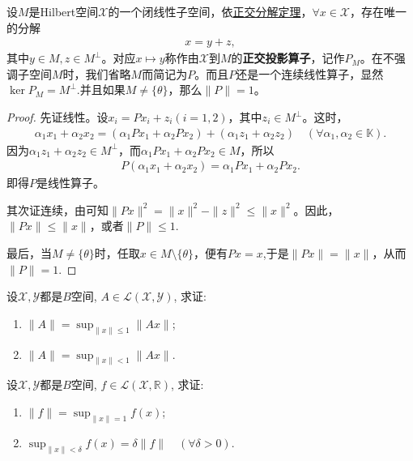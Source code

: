 \documentclass[../../main.tex]{subfiles}%
\begin{document}
\begin{theorem}\label{theorem:正交投影算子定义}
设$M$是Hilbert空间$\mathscr{X}$的一个闭线性子空间，依\hyperref[corollary:泛函分析--正交分解定理]{正交分解定理}，$\forall x\in\mathscr{X}$，存在唯一的分解
\begin{align*}
x=y+z,
\end{align*}
其中$y\in M,z\in M^\perp$。对应$x\mapsto y$称作由$\mathscr{X}$到$M$的\textbf{正交投影算子}，记作$P_M$。在不强调子空间$M$时，我们省略$M$而简记为$P$。而且$P$还是一个连续线性算子，显然$\ker P_M=M^\bot$.并且如果$M\neq\{\theta\}$，那么$\|P\|=1$。
\end{theorem}
\begin{proof}

先证线性。设$x_i=Px_i+z_i(i=1,2)$，其中$z_i\in M^\perp$。这时，
\begin{align*}
\alpha_1x_1+\alpha_2x_2=(\alpha_1Px_1+\alpha_2Px_2)+(\alpha_1z_1+\alpha_2z_2)\quad (\forall \alpha_1,\alpha_2\in\mathbb{K}).
\end{align*}
因为$\alpha_1z_1+\alpha_2z_2\in M^\perp$，而$\alpha_1Px_1+\alpha_2Px_2\in M$，所以
\begin{align*}
P(\alpha_1x_1+\alpha_2x_2)=\alpha_1Px_1+\alpha_2Px_2.
\end{align*}
即得$P$是线性算子。

其次证连续，由可知$\|Px\|^2=\|x\|^2-\|z\|^2\leqslant\|x\|^2$。因此，$\|Px\|\leqslant\|x\|$，或者$\|P\|\leqslant1$.

最后，当$M\neq\{\theta\}$时，任取$x\in M\setminus\{\theta\}$，便有$Px=x$,于是$\|Px\|=\|x\|$，从而$\|P\|=1$.
\end{proof}

\begin{example}
设$\mathscr{X},\mathscr{Y}$都是$B$空间, $A \in \mathscr{L}(\mathscr{X},\mathscr{Y})$, 求证:
\begin{enumerate}[(1)]
\item $\|A\| = \sup_{\|x\| \leqslant 1} \|Ax\|$;
\item $\|A\| = \sup_{\|x\| < 1} \|Ax\|$.
\end{enumerate}
\end{example}

\begin{example}
设$\mathscr{X},\mathscr{Y}$都是$B$空间, $f \in \mathscr{L}(\mathscr{X},\mathbb{R})$, 求证:
\begin{enumerate}[(1)]
\item $\|f\| = \sup_{\|x\| = 1} f(x)$;
\item $\sup_{\|x\| < \delta} f(x) = \delta\|f\| \quad (\forall \delta > 0)$.
\end{enumerate}
\end{example}
\end{document}
